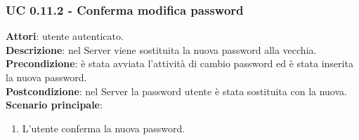 	\subsubsection{UC 0.11.2 - Conferma modifica password}{
		\label{uc0.11.2}
		\textbf{Attori}: utente autenticato.\\
		\textbf{Descrizione}: nel Server viene sostituita la nuova password alla vecchia. \\
		\textbf{Precondizione}: è stata avviata l'attività di cambio password ed è stata inserita la nuova password.	\\
		\textbf{Postcondizione}: nel Server la password utente è stata sostituita con la nuova.	\\
		\textbf{Scenario principale}:
		\begin{enumerate}
			\item L'utente conferma la nuova password.
		\end{enumerate}		
		}